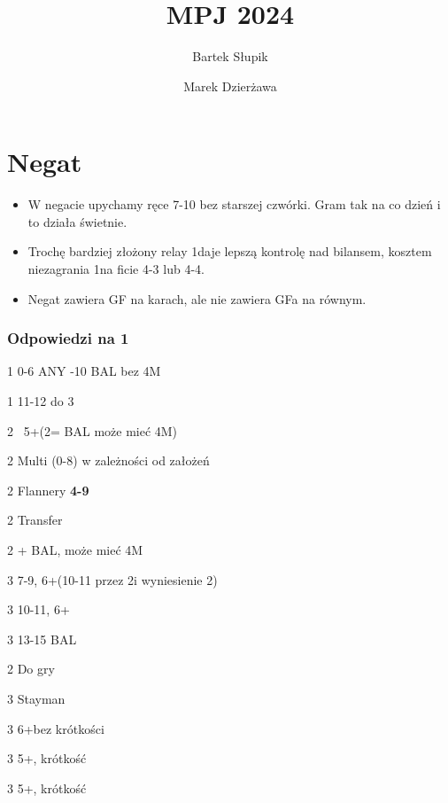 \documentclass[12pt, a4paper]{article}
\title{\vspace{-2cm}MPJ 2024}
\date{}
\author{Bartek Słupik \and Marek Dzierżawa}
\begin{document}
\maketitle

\section{Negat}
\begin{itemize}
    \item W negacie upychamy ręce 7-10 bez starszej czwórki. Gram tak na co dzień i to działa świetnie.
    \item Trochę bardziej złożony relay 1\hearts daje lepszą kontrolę nad bilansem, kosztem niezagrania 1\hearts na
    ficie 4-3 lub 4-4.
    \item Negat zawiera GF na karach, ale nie zawiera GFa na równym.
\end{itemize}

\vspace{0.5cm}
\subsubsection*{Odpowiedzi na 1\clubs}
\sequence{{1\clubs}}
\begin{options}[2]
    \item[1\diams] 0-6 ANY -10 BAL bez 4M \orr \gf\ \diams 
    \item[1\nt] 11-12 \inv do 3\nt \imp 
    \item[2\clubs] \gf\ 5+\clubs (2\diams = BAL może mieć 4M) 
    \item[2\diams] Multi (0-8) w zależności od założeń \imp  
    \item[2\hearts] Flannery \textbf{4-9} 
    \item[2\spades] Transfer \nt
    \item[2\nt] + BAL, może mieć 4M \vimp
    \item[3\clubs] 7-9, 6+\clubs (10-11 przez 2\spades i wyniesienie 2\nt)
    \item[3\diams] 10-11, 6+\diams
    \item[3\nt] 13-15 BAL 
\end{options}

\sequence{{1\clubs}{1\ntx}}
\begin{options}[1]
    \item[2\clubs] Do gry
\end{options}

\sequence{{1\clubs}{2\ntx}}
\begin{options}[1]
    \item[3\clubs] Stayman
    \item[3\diams] 6+\clubs bez krótkości
    \item[3\hearts] 5+\clubs, krótkość
    \item[3\spades] 5+\clubs, krótkość   
\end{options}
\end{document}
